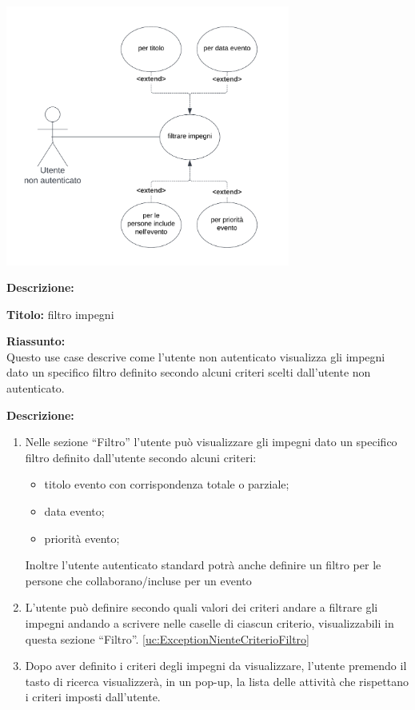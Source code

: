 \begin{listaPersonale}[UC]{}
    \newpage


    \begin{center}
        \includegraphics[width=0.7\textwidth]{img/Diagrammi/UseCases/Filtro.png}
    \end{center}

    \textbf{Descrizione:}

    \textbf{Titolo:} filtro impegni

    \textbf{Riassunto:} \\
    Questo use case descrive come l'utente non autenticato visualizza gli impegni dato un specifico filtro definito secondo alcuni criteri scelti dall'utente non autenticato.

    \textbf{Descrizione:}
    \begin{enumerate}
        \item Nelle sezione “Filtro” l'utente può visualizzare gli impegni dato un specifico filtro definito dall'utente secondo alcuni criteri:
              \begin{itemize}
                  \item titolo evento con corrispondenza totale o parziale;
                  \item data evento;
                  \item priorità evento;
              \end{itemize}
              Inoltre l'utente autenticato standard potrà anche definire un filtro per le persone che collaborano/incluse per un evento
        \item L'utente può definire secondo quali valori dei criteri andare a filtrare gli impegni andando a scrivere nelle caselle di ciascun criterio, visualizzabili in questa sezione “Filtro”. \ref{uc:ExceptionNienteCriterioFiltro}
        \item Dopo aver definito i criteri degli impegni da visualizzare, l'utente premendo il tasto di ricerca visualizzerà, in un pop-up, la lista delle attività che rispettano i criteri imposti dall'utente.


\end{enumerate}
\end{listaPersonale}
